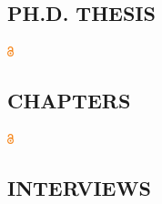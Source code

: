 \documentclass[11pt,letterpaper,resume,roman]{moderncv}
\newcommand{\openaccess}{\includegraphics[width=0.5em]{pics/Open_Access_logo_PLoS_white.pdf}}
\newcommand{\openaccesshref}[1]{\href{#1}{\openaccess}}
\begin{document}
\vspace{2em}

\subsection{PH.D. THESIS}

\begin{bibenum}[ref=\arabic*,parsep=-0.4em]
\item {} \openaccesshref{http://www.onerussian.com/Sci/thesis} %
\end{bibenum}
\vspace{2em}

%
%


\subsection{CHAPTERS}

\begin{bibenum}[ref=\arabic*,parsep=-0.4em]
\item {} \openaccesshref{http://www.onerussian.com/Sci/fusion} %
\end{bibenum}
\vspace{2em}

\subsection{INTERVIEWS}
\sloppy
\begin{bibenum}[ref=\arabic*,parsep=-0.4em]
\item {}
\item {}
\item {}
\end{bibenum}
\vspace{1em}
\end{document}
